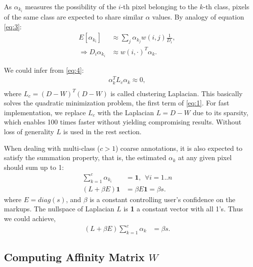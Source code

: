 \documentclass[sigconf]{acmart}
\begin{document}
As $\alpha_{k_i}$ measures the possibility of the $i$-th pixel belonging to the $k$-th class, pixels of the same class are expected to share similar $\alpha$ values. By analogy of equation \eqref{eq:3}:
\begin{equation}
\begin{split}
E[\alpha_{k_i}]~&\approx\sum_{j} \alpha_{k_j} w(i,j)\frac{1}{D_{i}},\\
\Rightarrow D_i\alpha_{k_i}&\approx w(i,\cdot)^T\alpha_k.
\end{split}
\label{eq:4}
\end{equation}

We could infer from \eqref{eq:4}:
\begin{equation}
\begin{split}
\alpha_k^T L_c \alpha_k \approx 0,\\
\end{split}
\label{eq:5}
\end{equation}
where $L_c = (D-W)^T(D-W)$ is called clustering Laplacian. This basically solves the quadratic minimization problem, the first term of \eqref{eq:1}. For fast implementation, we replace $L_c$ with the Laplacian $L = D - W$ due to its sparsity, which enables 100 times faster without yielding compromising results. Without loss of generality $L$ is used in the rest section.


When dealing with multi-class ($c >1$) coarse annotations, it is also expected to satisfy the summation property, that is, the estimated $\alpha_k$ at any given pixel should sum up to 1:
\begin{equation}
\begin{split}
\sum_{k=1}^c\alpha_{k_i} &=\textbf{1}, ~~ \forall i = 1..n\\
(L + \beta E)\textbf{1} &= \beta E\textbf{1} = \beta s.
\end{split}
\label{eq:6}
\end{equation}
where $E = diag(s)$, and $\beta$ is a constant controlling user's confidence on the markups. The nullspace of Laplacian $L$ is \textbf{1} a constant vector with all 1's. Thus we could achieve,
\vspace{-0.2cm}
\begin{equation}
\begin{split}
(L + \beta E)\sum_{k=1}^c\alpha_k &= \beta s.
\end{split}
\label{eq:7}
\end{equation}

\subsection{Computing Affinity Matrix $W$}
\end{document}
